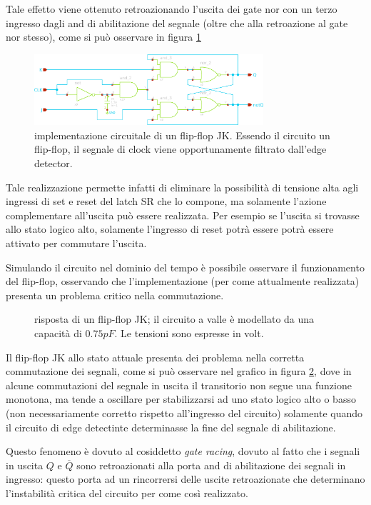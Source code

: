 	Tale effetto viene ottenuto retroazionando l'uscita dei gate nor con un terzo ingresso dagli and di abilitazione del segnale (oltre che alla retroazione al gate nor stesso), come si può osservare in figura \ref{fig:jkff:schema}
	
	\begin{figure}[bht]
		\centering
		\includegraphics[width=8.5cm]{Immagini/jk-flipflop}
		\caption{implementazione circuitale di un flip-flop JK. Essendo il circuito un flip-flop, il segnale di clock viene opportunamente filtrato dall'edge detector.}
		\label{fig:jkff:schema}
	\end{figure}
	Tale realizzazione permette infatti di eliminare la possibilità di tensione alta agli ingressi di set e reset del latch SR che lo compone, ma solamente l'azione complementare all'uscita può essere realizzata. Per esempio se l'uscita si trovasse allo stato logico alto, solamente l'ingresso di reset potrà essere potrà essere attivato per commutare l'uscita.
	
	Simulando il circuito nel dominio del tempo è possibile osservare il funzionamento del flip-flop, osservando che l'implementazione (per come attualmente realizzata) presenta un problema critico nella commutazione.
	
	\begin{figure}[bht]
		\centering
		
		\caption{risposta di un flip-flop JK; il circuito a valle è modellato da una capacità di $0.75pF$. Le tensioni sono espresse in volt.}
		\label{fig:jkff:sim-instabile}
	\end{figure}
	
	Il flip-flop JK allo stato attuale presenta dei problema nella corretta commutazione dei segnali, come si può osservare nel grafico in figura \ref{fig:jkff:sim-instabile}, dove in alcune commutazioni del segnale in uscita il transitorio non segue una funzione monotona, ma tende a oscillare per stabilizzarsi ad uno stato logico alto o basso (non necessariamente corretto rispetto all'ingresso del circuito) solamente quando il circuito di edge detectinte determinasse la fine del segnale di abilitazione.
	
	Questo fenomeno è dovuto al cosiddetto \textit{gate racing}, dovuto al fatto che i segnali in uscita $Q$ e $\overline Q$ sono retroazionati alla porta and di abilitazione dei segnali in ingresso: questo porta ad un rincorrersi delle uscite retroazionate che determinano l'instabilità critica del circuito per come così realizzato.
	
